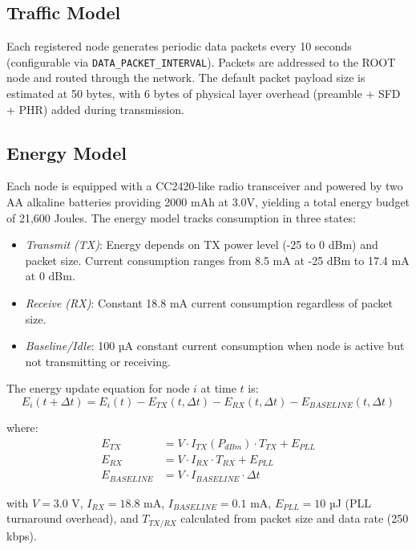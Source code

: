 \documentclass[conference]{IEEEtran}
\begin{document}
\subsection{Traffic Model}
Each registered node generates periodic data packets every 10 seconds (configurable via \texttt{DATA\_PACKET\_INTERVAL}). Packets are addressed to the ROOT node and routed through the network. The default packet payload size is estimated at 50 bytes, with 6 bytes of physical layer overhead (preamble + SFD + PHR) added during transmission.

\subsection{Energy Model}
Each node is equipped with a CC2420-like radio transceiver and powered by two AA alkaline batteries providing 2000 mAh at 3.0V, yielding a total energy budget of 21,600 Joules. The energy model tracks consumption in three states:

\begin{itemize}
    \item \emph{Transmit (TX)}: Energy depends on TX power level (-25 to 0 dBm) and packet size. Current consumption ranges from 8.5 mA at -25 dBm to 17.4 mA at 0 dBm.
    \item \emph{Receive (RX)}: Constant 18.8 mA current consumption regardless of packet size.
    \item \emph{Baseline/Idle}: 100 µA constant current consumption when node is active but not transmitting or receiving.
\end{itemize}

The energy update equation for node $i$ at time $t$ is:
\begin{equation}
E_i(t + \Delta t) = E_i(t) - E_{TX}(t, \Delta t) - E_{RX}(t, \Delta t) - E_{BASELINE}(t, \Delta t)
\label{eq:energy_update}
\end{equation}

where:
\begin{align}
E_{TX} &= V \cdot I_{TX}(P_{dBm}) \cdot T_{TX} + E_{PLL} \\
E_{RX} &= V \cdot I_{RX} \cdot T_{RX} + E_{PLL} \\
E_{BASELINE} &= V \cdot I_{BASELINE} \cdot \Delta t
\end{align}

with $V = 3.0$ V, $I_{RX} = 18.8$ mA, $I_{BASELINE} = 0.1$ mA, $E_{PLL} = 10$ µJ (PLL turnaround overhead), and $T_{TX/RX}$ calculated from packet size and data rate (250 kbps).
\end{document}
